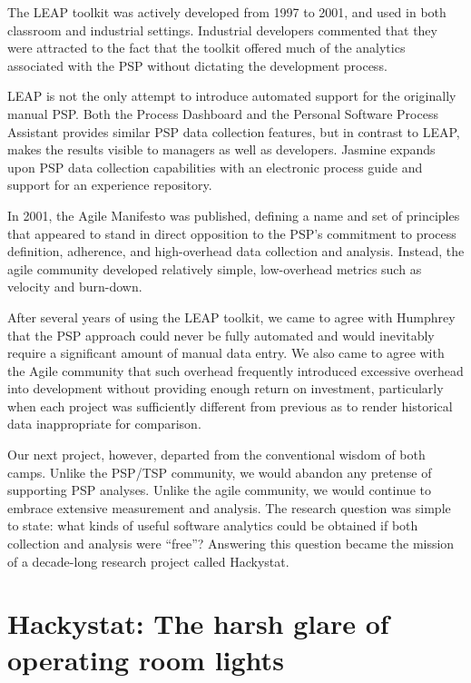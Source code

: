 \documentclass[]{article}
\begin{document}
The LEAP toolkit was actively developed from 1997 to 2001, and used in
both classroom and industrial settings.  Industrial developers commented that they were
attracted to the fact that the toolkit offered much of the analytics associated with the
PSP without dictating the development process.  

LEAP is not the only attempt to introduce automated support for the originally manual
PSP. Both the Process Dashboard and the Personal Software Process Assistant
\cite{Sison2005} provides similar PSP data collection features, but in contrast to LEAP,
makes the results visible to managers as well as developers.  Jasmine \cite{Shin2007}
expands upon PSP data collection capabilities with an electronic process guide and support
for an experience repository.

In 2001, the Agile Manifesto was published, defining a name and set of principles that appeared
to stand in direct opposition to the PSP's commitment to process definition, adherence,
and high-overhead data collection and analysis. Instead, the agile community developed
relatively simple, low-overhead metrics such as velocity and burn-down.


After several years of using the LEAP toolkit, we came to agree with Humphrey that the PSP
approach could never be fully automated and would inevitably require a significant amount
of manual data entry.  We also came to agree with the Agile community that such overhead
frequently introduced excessive overhead into development without providing enough return
on investment, particularly when each project was sufficiently different from previous as
to render historical data inappropriate for comparison.

Our next project, however, departed from the conventional wisdom of both camps. Unlike the
PSP/TSP community, we would abandon any pretense of supporting PSP analyses.  Unlike the
agile community, we would continue to embrace extensive measurement and analysis.  The
research question was simple to state: what kinds of useful software analytics could be
obtained if both collection and analysis were ``free''?  Answering this question became
the mission of a decade-long research project called Hackystat.

\section{Hackystat:  The harsh glare of operating room lights}
\end{document}
